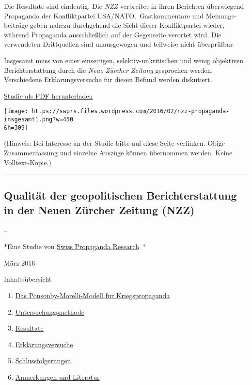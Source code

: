 Die Resultate sind eindeutig: Die \emph{NZZ} verbreitet in ihren
Berichten überwiegend Propaganda der Konfliktpartei
USA/NATO.~Gast­kommentare und Meinungs­beiträge geben nahezu durchgehend
die Sicht dieser Konflikt­partei wieder, während Propaganda
ausschließlich auf der Gegenseite verortet wird. Die verwendeten
Drittquellen sind unausgewogen und teilweise nicht überprüfbar.

Insgesamt muss von einer einseitigen, selektiv-unkritischen und wenig
objektiven Berichterstattung durch die \emph{Neue Zürcher Zeitung}
gesprochen werden. Verschiedene Erklärungs­versuche für diesen Befund
werden diskutiert.

\href{https://swprs.files.wordpress.com/2017/12/nzz-propaganda-studie-2016tp.pdf}{Studie
als PDF herunterladen}

\texttt{[image: https://swprs.files.wordpress.com/2016/02/nzz-propaganda-insgesamt1.png?w=450\\\&h=309]}

(Hinweis: Bei Interesse an der Studie bitte auf diese Seite verlinken.
Obige Zusammen­fassung und einzelne Auszüge können übernommen werden.
Keine Volltext-Kopie.)

\begin{center}\rule{0.5\linewidth}{\linethickness}\end{center}

\hypertarget{qualituxe4t-der-geopolitischen-berichterstattung-in-der-neuen-zuxfcrcher-zeitung-nzz}{%
\subsection{Qualität der geopolitischen Berichterstattung in der Neuen
Zürcher Zeitung
(NZZ)}\label{qualituxe4t-der-geopolitischen-berichterstattung-in-der-neuen-zuxfcrcher-zeitung-nzz}}

--

*Eine Studie von \href{https://swprs.org}{Swiss Propaganda Research}~*

März 2016

Inhaltsübersicht

\begin{enumerate}
\def\labelenumi{\arabic{enumi}.}
\tightlist
\item
  \protect\hyperlink{kapitel1}{Das Ponsonby-Morelli-Modell für
  Kriegspropaganda}
\item
  \protect\hyperlink{kapitel2}{Untersuchungsmethode}
\item
  \protect\hyperlink{kapitel3}{Resultate}
\item
  \protect\hyperlink{kapitel4}{Erklärungsversuche}
\item
  \protect\hyperlink{kapitel5}{Schlussfolgerungen}
\item
  \protect\hyperlink{kapitel6}{Anmerkungen und Literatur}
\end{enumerate}

